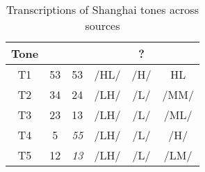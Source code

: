 \begin{table}[htbp]
	\centering
	\begin{tabular}{cccccc}
		\toprule
		Tone & \citet{MFCdatabase} & \citet{xu1988description} & \citet{duanmu1999metrical} &  ?  & \citet{zee1979tones} \\ \midrule
		 T1  &         53          &            53             &            /HL/            & /H/ &          HL          \\
		 T2  &         34          &            24             &            /LH/            & /L/ &         /MM/         \\
		 T3  &         23          &            13             &            /LH/            & /L/ &         /ML/         \\
		 T4  &          5          &         \emph{55}         &            /LH/            & /L/ &         /H/          \\
		 T5  &         12          &         \emph{13}         &            /LH/            & /L/ &         /LM/         \\ \bottomrule
	\end{tabular}
	\caption{Transcriptions of Shanghai tones across sources}
	\label{tab:transcript}
\end{table}
